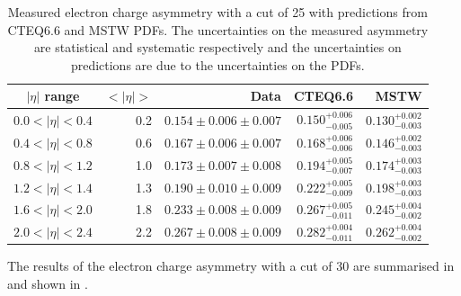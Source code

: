\begin{table}[htbp]
\begin{center}
\begin{tabular}{crrrr}
    \toprule
$|\eta|$ range & $<|\eta|>$ & Data & CTEQ6.6 & MSTW \\
\midrule 
$0.0<|\eta|<0.4$ & 0.2 & $0.154\pm0.006\pm0.007$ & $0.150^{+0.006}_{-0.005}$ & $0.130^{+0.002}_{-0.003}$\\
$0.4<|\eta|<0.8$ & 0.6 & $0.167\pm0.006\pm0.007$ & $0.168^{+0.006}_{-0.006}$ & $0.146^{+0.002}_{-0.003}$\\
$0.8<|\eta|<1.2$ & 1.0 & $0.173\pm0.007\pm0.008$ & $0.194^{+0.005}_{-0.007}$ & $0.174^{+0.003}_{-0.003}$\\
$1.2<|\eta|<1.4$ & 1.3 & $0.190\pm0.010\pm0.009$ & $0.222^{+0.005}_{-0.009}$ & $0.198^{+0.003}_{-0.003}$\\
$1.6<|\eta|<2.0$ & 1.8 & $0.233\pm0.008\pm0.009$ & $0.267^{+0.005}_{-0.011}$ & $0.245^{+0.004}_{-0.002}$\\
$2.0<|\eta|<2.4$ & 2.2 & $0.267\pm0.008\pm0.009$ & $0.282^{+0.004}_{-0.011}$ & $0.262^{+0.004}_{-0.002}$\\
    \bottomrule
\end{tabular}
\caption{Measured electron charge asymmetry with a \pT cut of \unit{25}{\GeV}
with predictions from CTEQ6.6 and MSTW PDFs.  The uncertainties on the measured
asymmetry are statistical and systematic respectively and the uncertainties on
predictions are due to the uncertainties on the PDFs.}
\label{tab:results25}
\end{center}
\end{table}

The results of the electron charge asymmetry with a \pT cut of \unit{30}{\GeV}
are summarised in  and shown in
.

